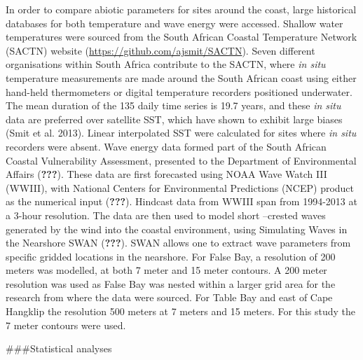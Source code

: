 \documentclass[10pt,a4,]{article}
\begin{document}
In order to compare abiotic parameters for sites around the coast, large
historical databases for both temperature and wave energy were accessed.
Shallow water temperatures were sourced from the South African Coastal
Temperature Network (SACTN) website
(\url{https://github.com/ajsmit/SACTN}). Seven different organisations
within South Africa contribute to the SACTN, where \emph{in situ}
temperature measurements are made around the South African coast using
either hand-held thermometers or digital temperature recorders
positioned underwater. The mean duration of the 135 daily time series is
19.7 years, and these \emph{in situ} data are preferred over satellite
SST, which have shown to exhibit large biases (Smit et al. 2013). Linear
interpolated SST were calculated for sites where \emph{in situ}
recorders were absent. Wave energy data formed part of the South African
Coastal Vulnerability Assessment, presented to the Department of
Environmental Affairs ({\textbf{???}}). These data are first forecasted
using NOAA Wave Watch III (WWIII), with National Centers for
Environmental Predictions (NCEP) product as the numerical input
({\textbf{???}}). Hindcast data from WWIII span from 1994-2013 at a
3-hour resolution. The data are then used to model short --crested waves
generated by the wind into the coastal environment, using Simulating
Waves in the Nearshore SWAN ({\textbf{???}}). SWAN allows one to extract
wave parameters from specific gridded locations in the nearshore. For
False Bay, a resolution of 200 meters was modelled, at both 7 meter and
15 meter contours. A 200 meter resolution was used as False Bay was
nested within a larger grid area for the research from where the data
were sourced. For Table Bay and east of Cape Hangklip the resolution 500
meters at 7 meters and 15 meters. For this study the 7 meter contours
were used.

\#\#\#Statistical analyses
\end{document}
